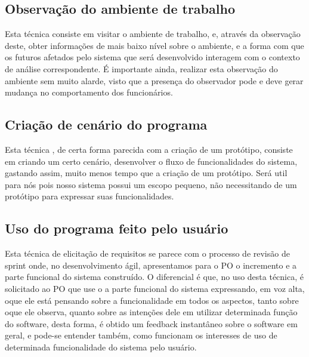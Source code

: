   \subsection{Observação do ambiente de trabalho}
  
  Esta técnica consiste em visitar o ambiente de trabalho, e, através da observação deste, obter informações de
  mais baixo nível sobre o ambiente, e a forma com que os futuros afetados pelo sistema que será desenvolvido interagem
  com o contexto de análise correspondente. É importante ainda, realizar esta observação do ambiente sem muito alarde,
  visto que a presença do observador pode e deve gerar mudança no comportamento dos funcionários.
  
  \subsection{Criação de cenário do programa}
  
  Esta técnica , de certa forma parecida com  a criação de um protótipo, consiste em criando um certo cenário,
  desenvolver o fluxo de funcionalidades do sistema, gastando assim, muito menos tempo que a criação de um protótipo.
  Será util para nós pois nosso sistema possui um escopo pequeno, não necessitando de um protótipo para expressar 
  suas funcionalidades.
  
  \subsection{Uso do programa feito pelo usuário}
  
  Esta técnica de elicitação de requisitos se parece com o processo de revisão de sprint
  onde, no desenvolvimento ágil, apresentamos para o PO o incremento e a parte funcional do sistema construído.
  O diferencial é que, no uso desta técnica, é solicitado ao PO que use o a parte funcional do sistema expressando, 
  em voz alta, oque ele está pensando sobre a funcionalidade em todos os aspectos, tanto sobre oque ele observa, quanto
  sobre as intenções dele em utilizar determinada função do software, desta forma, é obtido um feedback
  instantâneo sobre o software em geral, e pode-se entender também, 
  como funcionam os interesses de uso de determinada funcionalidade
  do sistema pelo usuário.
